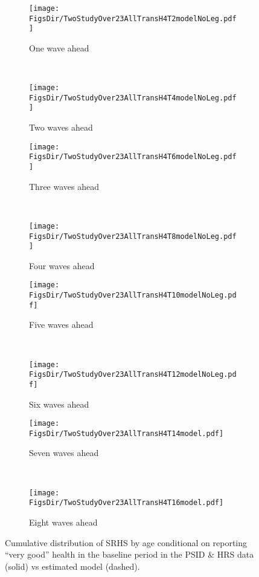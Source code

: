 \documentclass[12pt,pdftex,letterpaper]{article}
\newcommand{\RootDir}{..}
\newcommand{\FigsDir}{\RootDir/Figures}
\begin{document}
\begin{figure}
	\centering
	\begin{subfigure}[b]{0.48\textwidth}
		\texttt{[image: \\FigsDir/TwoStudyOver23AllTransH4T2modelNoLeg.pdf]}
		\caption{One wave ahead}\label{fig:Model1AheadVeryGood}
	\end{subfigure}
	~
	\begin{subfigure}[b]{0.48\textwidth}
		\texttt{[image: \\FigsDir/TwoStudyOver23AllTransH4T4modelNoLeg.pdf]}
		\caption{Two waves ahead}\label{fig:Model2AheadVeryGood}
	\end{subfigure}
	
	\begin{subfigure}[b]{0.48\textwidth}
		\texttt{[image: \\FigsDir/TwoStudyOver23AllTransH4T6modelNoLeg.pdf]}
		\caption{Three waves ahead}\label{fig:Model3AheadVeryGood}
	\end{subfigure}
	~
	\begin{subfigure}[b]{0.48\textwidth}
		\texttt{[image: \\FigsDir/TwoStudyOver23AllTransH4T8modelNoLeg.pdf]}
		\caption{Four waves ahead}\label{fig:Model4AheadVeryGood}
	\end{subfigure}
	
	\begin{subfigure}[b]{0.48\textwidth}
		\texttt{[image: \\FigsDir/TwoStudyOver23AllTransH4T10modelNoLeg.pdf]}
		\caption{Five waves ahead}\label{fig:Model5AheadVeryGood}
	\end{subfigure}
	~
	\begin{subfigure}[b]{0.48\textwidth}
		\texttt{[image: \\FigsDir/TwoStudyOver23AllTransH4T12modelNoLeg.pdf]}
		\caption{Six waves ahead}\label{fig:Model6AheadVeryGood}
	\end{subfigure}
	
	\begin{subfigure}[b]{0.48\textwidth}
		\texttt{[image: \\FigsDir/TwoStudyOver23AllTransH4T14model.pdf]}
		\caption{Seven waves ahead}\label{fig:Model7AheadVeryGood}
	\end{subfigure}
	~
	\begin{subfigure}[b]{0.48\textwidth}
		\texttt{[image: \\FigsDir/TwoStudyOver23AllTransH4T16model.pdf]}
		\caption{Eight waves ahead}\label{fig:Model8AheadVeryGood}
	\end{subfigure}
	\caption{Cumulative distribution of SRHS by age conditional on reporting ``very good'' health in the baseline period in the PSID \& HRS data (solid) vs estimated model (dashed).}\label{fig:ModelTransVGa}
\end{figure}
\end{document}

